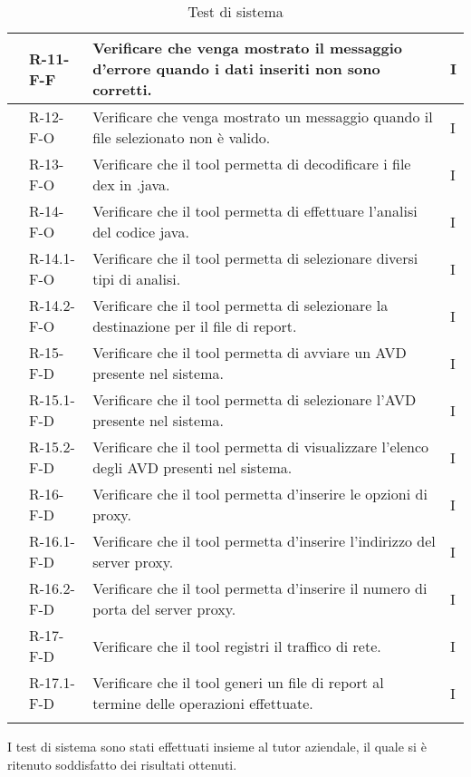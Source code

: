 \begin{longtable}{ | C{2.5cm} |C{2cm} |C{7cm} |C{1.5cm}|}
     & R-11-F-F   & Verificare che venga mostrato il messaggio d'errore quando i dati inseriti non sono corretti.& I \\\hline
     & R-12-F-O   & Verificare che venga mostrato un messaggio quando il file selezionato non è valido.& I \\\hline
     & R-13-F-O   & Verificare che il tool permetta di decodificare i file dex in .java.& I \\\hline
     & R-14-F-O   & Verificare che il tool permetta di effettuare l'analisi del codice java.& I \\\hline
     & R-14.1-F-O & Verificare che il tool permetta di selezionare diversi tipi di analisi.& I \\\hline
     & R-14.2-F-O & Verificare che il tool permetta di selezionare la destinazione per il file di report.& I \\\hline
     & R-15-F-D   & Verificare che il tool permetta di avviare un AVD presente nel sistema.& I \\\hline
     & R-15.1-F-D & Verificare che il tool permetta di selezionare l'AVD presente nel sistema.& I \\\hline
     & R-15.2-F-D & Verificare che il tool permetta di visualizzare l'elenco degli AVD presenti nel sistema.& I \\\hline
     & R-16-F-D   & Verificare che il tool permetta d'inserire le opzioni di proxy.& I \\\hline
     & R-16.1-F-D & Verificare che il tool permetta d'inserire l'indirizzo del server proxy.& I \\\hline
     & R-16.2-F-D & Verificare che il tool permetta d'inserire il numero di porta del server proxy.& I \\\hline
     & R-17-F-D   & Verificare che il tool registri il traffico di rete.& I \\\hline
     & R-17.1-F-D & Verificare che il tool generi un file di report al termine delle operazioni effettuate.& I \\\hline
    \caption{Test di sistema}
\end{longtable}
\setcounter{subCount}{0}
\setcounter{rowcount}{0}
I test di sistema sono stati effettuati insieme al tutor aziendale, il quale si è ritenuto soddisfatto dei risultati ottenuti.

